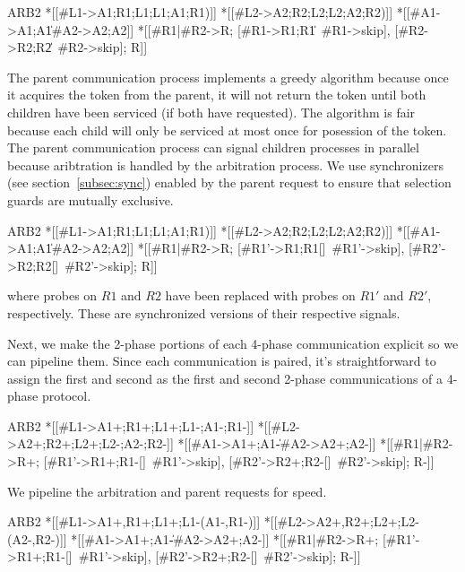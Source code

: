 \documentclass{article}
\begin{document}
\begin{csp}
ARB2\equiv
  *[[#{L1}->A1;R1;L1;L1;A1;R1)]] \pll
  *[[#{L2}->A2;R2;L2;L2;A2;R2)]] \pll
  *[[#{A1}->A1;A1\|#{A2}->A2;A2]]\pll
  *[[#{R1}|#{R2}->R;
    [#{R1}->R1;R1\|~#{R1}->skip],
    [#{R2}->R2;R2\|~#{R2}->skip];
    R]]
\end{csp}

The parent communication process implements a greedy algorithm because once it acquires the token from the parent,
it will not return the token until both children have been serviced (if both have requested). 
The algorithm is fair because each child will only be serviced at most once for posession of the token.
The parent communication process can signal children processes in parallel because aribtration is handled by the arbitration process.
We use synchronizers (see section~\ref{subsec:sync}) enabled by the parent request to ensure that selection guards are mutually exclusive.


\begin{csp}
ARB2\equiv
  *[[#{L1}->A1;R1;L1;L1;A1;R1)]] \pll
  *[[#{L2}->A2;R2;L2;L2;A2;R2)]] \pll
  *[[#{A1}->A1;A1\|#{A2}->A2;A2]]\pll
  *[[#{R1}|#{R2}->R;
    [#{R1'}->R1;R1[]~#{R1'}->skip],
    [#{R2'}->R2;R2[]~#{R2'}->skip];
    R]]
\end{csp}
where probes on $R1$ and $R2$ have been replaced with probes on $R1'$ and $R2'$, respectively. 
These are synchronized versions of their respective signals.

Next, we make the 2-phase portions of each 4-phase communication explicit so we can pipeline them.
Since each communication is paired, it's straightforward to assign the first and second as the first and second
2-phase communications of a 4-phase protocol. 

\begin{csp}
ARB2\equiv
  *[[#{L1}->A1+;R1+;L1+;L1-;A1-;R1-]] \pll
  *[[#{L2}->A2+;R2+;L2+;L2-;A2-;R2-]] \pll
  *[[#{A1}->A1+;A1-\|#{A2}->A2+;A2-]]\pll
  *[[#{R1}|#{R2}->R+;
    [#{R1'}->R1+;R1-[]~#{R1'}->skip],
    [#{R2'}->R2+;R2-[]~#{R2'}->skip];
    R-]]
\end{csp}

We pipeline the arbitration and parent requests for speed.

\begin{csp}
ARB2\equiv
  *[[#{L1}->A1+,R1+;L1+;L1-\star(A1-,R1-)]] \pll
  *[[#{L2}->A2+,R2+;L2+;L2-\star(A2-,R2-)]] \pll
  *[[#{A1}->A1+;A1-\|#{A2}->A2+;A2-]]\pll
  *[[#{R1}|#{R2}->R+;
    [#{R1'}->R1+;R1-[]~#{R1'}->skip],
    [#{R2'}->R2+;R2-[]~#{R2'}->skip];
    R-]]
\end{csp}
\end{document}
